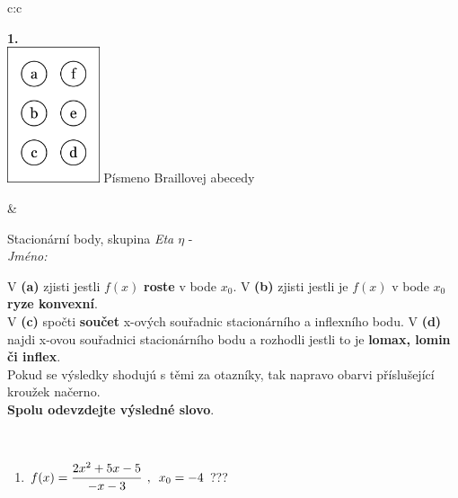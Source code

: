 \documentclass[10pt]{report}
\begin{document}
\begin{tabular}{c:c}
\begin{minipage}[c][104.5mm][t]{0.5\linewidth}
\begin{center}
\begin{minipage}{0.79\linewidth}
\end{minipage}
\begin{minipage}{0.20\linewidth}
\begin{center}
{\Huge\bfseries 1.} \\[2mm]
\includegraphics[height=40mm]{../images/braille.png}
{\small Písmeno Braillovej abecedy}
\end{center}
\end{minipage}
\end{center}
\end{minipage}
&
\begin{minipage}[c][104.5mm][t]{0.5\linewidth}
\begin{center}
\vspace{7mm}
{\huge Stacionární body, skupina \textit{Eta $\eta$} -}\\[5mm]
\textit{Jméno:}\phantom{xxxxxxxxxxxxxxxxxxxxxxxxxxxxxxxxxxxxxxxxxxxxxxxxxxxxxxxxxxxxxxxxx}\\[5mm]
\begin{minipage}{0.95\linewidth}
\begin{center}
{\small V \textbf{(a)} zjisti jestli $f(x)$ \textbf{roste} v bode $x_0$. V \textbf{(b)} zjisti jestli je $f(x)$ v bode $x_0$ \textbf{ryze konvexní}.\\V \textbf{(c)} spočti \textbf{součet} x-ových souřadnic stacionárního a inflexního bodu. V \textbf{(d)} najdi x-ovou souřadnici stacionárního bodu a rozhodli jestli to je \textbf{lomax, lomin či inflex}.\\Pokud se výsledky shodujú s těmi za otazníky, tak napravo obarvi příslušející kroužek načerno.\\\textbf{Spolu odevzdejte výsledné slovo}}.
\end{center}
\end{minipage}
\\[1mm]
\begin{minipage}{0.79\linewidth}
\begin{center}
\begin{varwidth}{\linewidth}
\begin{enumerate}
\normalsize
\item $f(x)=\cfrac{2x^2+5x-5}{-x-3}\enspace , \enspace x_0=-4$\quad \dotfill\; ???\;\dotfill \quad {}

\end{enumerate}
\end{varwidth}
\end{center}
\end{minipage}
\end{center}
\end{minipage}
\end{tabular}
\end{document}
